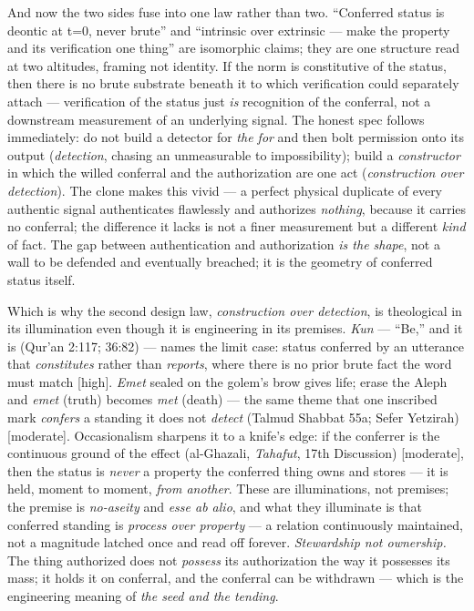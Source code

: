 \documentclass[11pt]{article}
\begin{document}
And now the two sides fuse into one law rather than two. ``Conferred status is deontic at t=0, never brute'' and ``intrinsic over extrinsic — make the property and its verification one thing'' are isomorphic claims; they are one structure read at two altitudes, framing not identity. If the norm is constitutive of the status, then there is no brute substrate beneath it to which verification could separately attach — verification of the status just \emph{is} recognition of the conferral, not a downstream measurement of an underlying signal. The honest spec follows immediately: do not build a detector for \emph{the for} and then bolt permission onto its output (\emph{detection}, chasing an unmeasurable to impossibility); build a \emph{constructor} in which the willed conferral and the authorization are one act (\emph{construction over detection}). The clone makes this vivid — a perfect physical duplicate of every authentic signal authenticates flawlessly and authorizes \emph{nothing}, because it carries no conferral; the difference it lacks is not a finer measurement but a different \emph{kind} of fact. The gap between authentication and authorization \emph{is the shape}, not a wall to be defended and eventually breached; it is the geometry of conferred status itself.

Which is why the second design law, \emph{construction over detection}, is theological in its illumination even though it is engineering in its premises. \emph{Kun} — ``Be,'' and it is (Qur'an 2:117; 36:82) — names the limit case: status conferred by an utterance that \emph{constitutes} rather than \emph{reports}, where there is no prior brute fact the word must match [high]. \emph{Emet} sealed on the golem's brow gives life; erase the Aleph and \emph{emet} (truth) becomes \emph{met} (death) — the same theme that one inscribed mark \emph{confers} a standing it does not \emph{detect} (Talmud Shabbat 55a; Sefer Yetzirah) [moderate]. Occasionalism sharpens it to a knife's edge: if the conferrer is the continuous ground of the effect (al-Ghazali, \emph{Tahafut}, 17th Discussion) [moderate], then the status is \emph{never} a property the conferred thing owns and stores — it is held, moment to moment, \emph{from another}. These are illuminations, not premises; the premise is \emph{no-aseity} and \emph{esse ab alio}, and what they illuminate is that conferred standing is \emph{process over property} — a relation continuously maintained, not a magnitude latched once and read off forever. \emph{Stewardship not ownership.} The thing authorized does not \emph{possess} its authorization the way it possesses its mass; it holds it on conferral, and the conferral can be withdrawn — which is the engineering meaning of \emph{the seed and the tending}.
\end{document}
